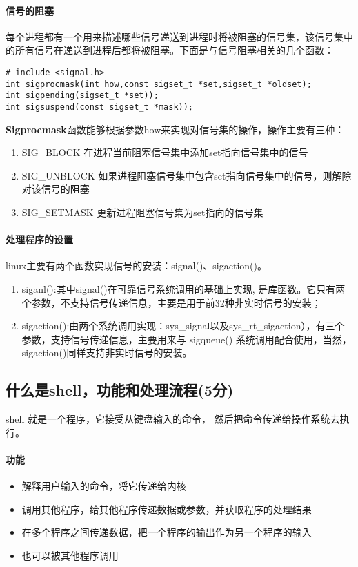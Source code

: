 \paragraph{信号的阻塞}每个进程都有一个用来描述哪些信号递送到进程时将被阻塞的信号集，该信号集中的所有信号在递送到进程后都将被阻塞。下面是与信号阻塞相关的几个函数：

\begin{verbatim}
# include <signal.h>
int sigprocmask(int how,const sigset_t *set,sigset_t *oldset);
int sigpending(sigset_t *set));
int sigsuspend(const sigset_t *mask));
\end{verbatim}

\textbf{Sigprocmask}函数能够根据参数how来实现对信号集的操作，操作主要有三种：

\begin{enumerate}
    \item SIG\_BLOCK	在进程当前阻塞信号集中添加set指向信号集中的信号
    \item SIG\_UNBLOCK	如果进程阻塞信号集中包含set指向信号集中的信号，则解除对该信号的阻塞
    \item SIG\_SETMASK	更新进程阻塞信号集为set指向的信号集
\end{enumerate}

\paragraph{处理程序的设置}linux主要有两个函数实现信号的安装：signal()、sigaction()。
\begin{enumerate}
\item siganl():其中signal()在可靠信号系统调用的基础上实现, 是库函数。它只有两个参数，不支持信号传递信息，主要是用于前32种非实时信号的安装；
\item sigaction():由两个系统调用实现：sys\_signal以及sys\_rt\_sigaction），有三个参数，支持信号传递信息，主要用来与 sigqueue() 系统调用配合使用，当然，sigaction()同样支持非实时信号的安装。
\end{enumerate}

\subsection{什么是shell，功能和处理流程(5分)}
shell 就是一个程序，它接受从键盘输入的命令， 然后把命令传递给操作系统去执行。
\paragraph{功能}
\begin{itemize}
    \item 解释用户输入的命令，将它传递给内核
    \item 调用其他程序，给其他程序传递数据或参数，并获取程序的处理结果
    \item 在多个程序之间传递数据，把一个程序的输出作为另一个程序的输入
    \item 也可以被其他程序调用
\end{itemize}

